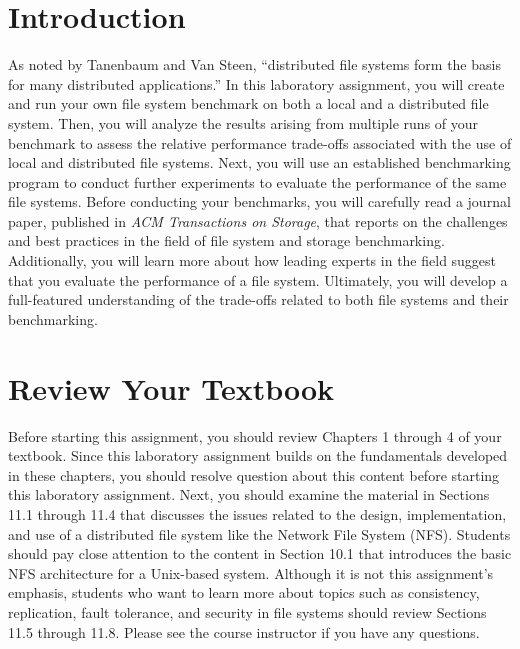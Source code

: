 

\usepackage[compact]{titlesec}



\section*{Introduction}

As noted by Tanenbaum and Van Steen, ``distributed file systems form the basis for many distributed applications.'' In
this laboratory assignment, you will create and run your own file system benchmark on both a local and a distributed
file system. Then, you will analyze the results arising from multiple runs of your benchmark to assess the relative
performance trade-offs associated with the use of local and distributed file systems. Next, you will use an established
benchmarking program to conduct further experiments to evaluate the performance of the same file systems. Before
conducting your benchmarks, you will carefully read a journal paper, published in {\em ACM Transactions on Storage},
that reports on the challenges and best practices in the field of file system and storage benchmarking. Additionally,
you will learn more about how leading experts in the field suggest that you evaluate the performance of a file system.
Ultimately, you will develop a full-featured understanding of the trade-offs related to both file systems and their
benchmarking.

\section*{Review Your Textbook}

Before starting this assignment, you should review Chapters 1 through 4 of your textbook. Since this laboratory
assignment builds on the fundamentals developed in these chapters, you should resolve question about this content before
starting this laboratory assignment. Next, you should examine the material in Sections 11.1 through 11.4 that discusses
the issues related to the design, implementation, and use of a distributed file system like the Network File System
(NFS). Students should pay close attention to the content in Section 10.1 that introduces the basic NFS architecture for
a Unix-based system. Although it is not this assignment's emphasis, students who want to learn more about topics such as
consistency, replication, fault tolerance, and security in file systems should review Sections 11.5 through 11.8.
Please see the course instructor if you have any questions.

